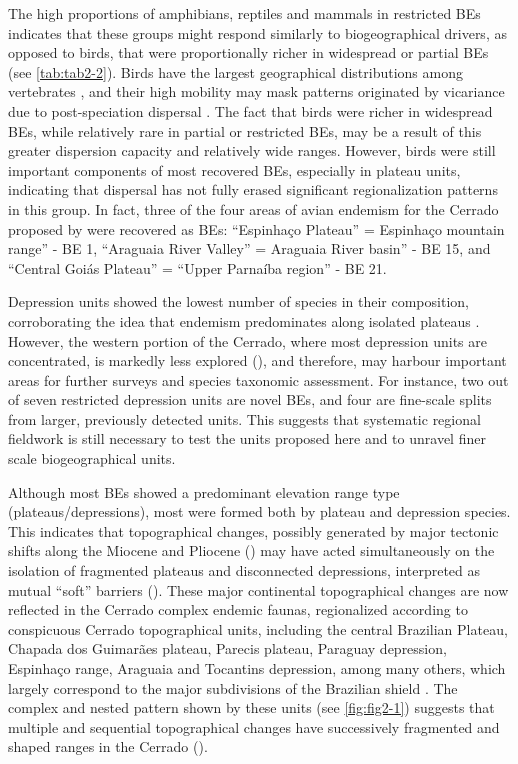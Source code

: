 \documentclass[12pt,openright,oneside,a4paper,english]{abntex2}
\begin{document}
The high proportions of amphibians, reptiles and mammals in restricted BEs indicates that these groups might respond similarly to biogeographical drivers, as opposed to birds, that were proportionally richer in widespread or partial BEs (see \autoref{tab:tab2-2}). Birds have the largest geographical distributions among vertebrates \citep{Gaston1996}, and their high mobility \citep{Sick1997} may mask patterns originated by vicariance due to post-speciation dispersal \citep{Hausdorf2002}. The fact that birds were richer in widespread BEs, while relatively rare in partial or restricted BEs, may be a result of this greater dispersion capacity and relatively wide ranges. However, birds were still important components of most recovered BEs, especially in plateau units, indicating that dispersal has not fully erased significant regionalization patterns in this group. In fact, three of the four areas of avian endemism for the Cerrado proposed by \citet{Silva1997} were recovered as BEs: “Espinhaço Plateau” = Espinhaço mountain range” - BE 1, “Araguaia River Valley” = Araguaia River basin” - BE 15, and “Central Goiás Plateau” = “Upper Parnaíba region” - BE 21.

Depression units showed the lowest number of species in their composition, corroborating the idea that endemism predominates along isolated plateaus \citep{Nogueira2011}. However, the western portion of the Cerrado, where most depression units are concentrated, is markedly less explored (\citealp[see][]{Oliveira2016}), and therefore, may harbour important areas for further surveys and species taxonomic assessment. For instance, two out of seven restricted depression units are novel BEs, and four are fine-scale splits from larger, previously detected units. This suggests that systematic regional fieldwork is still necessary to test the units proposed here and to unravel finer scale biogeographical units.

Although most BEs showed a predominant elevation range type (plateaus/depressions), most were formed both by plateau and depression species. This indicates that topographical changes, possibly generated by major tectonic shifts along the Miocene and Pliocene (\citealp[see][and references therein]{Silva1997, TeixeiraJr2016,Oliveira2018}) may have acted simultaneously on the isolation of fragmented plateaus and disconnected depressions, interpreted as mutual “soft” barriers (\citealp[see][]{TeixeiraJr2016}). These major continental topographical changes are now reflected in the Cerrado complex endemic faunas, regionalized according to conspicuous Cerrado topographical units, including the central Brazilian Plateau, Chapada dos Guimarães plateau, Parecis plateau, Paraguay depression, Espinhaço range, Araguaia and Tocantins depression, among many others, which largely correspond to the major subdivisions of the Brazilian shield \citep{Silva1997}. The complex and nested pattern shown by these units (see \autoref{fig:fig2-1}) suggests that multiple and sequential topographical changes have successively fragmented and shaped ranges in the Cerrado (\citealp[see][]{Silva1997, Nogueira2011, Vasconcellos2019}).
\end{document}
